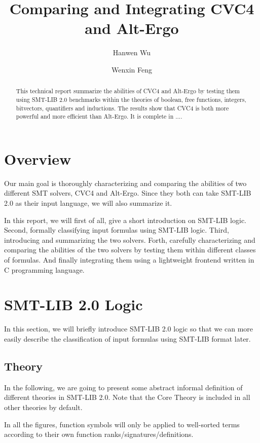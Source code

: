 \documentclass[11pt,letter]{article}
\title{Comparing and Integrating CVC4 and Alt-Ergo}
\author{Hanwen Wu}
\author{Wenxin Feng}
\affil{ Department of Computer Science\\Boston University\\ \small\texttt{hwwu,wenxinf@bu.edu}}
\theoremstyle{definition}
\begin{document}
\maketitle

\begin{abstract}
This technical report summarize the abilities of CVC4 and Alt-Ergo by testing them using SMT-LIB 2.0 benchmarks within the theories of boolean, free functions, integers, bitvectors, quantifiers and inductions. The results show that CVC4 is both more powerful and more efficient than Alt-Ergo. It is complete in ....
\end{abstract}
\section{Overview}

Our main goal is thoroughly characterizing and comparing the abilities of two different SMT solvers, CVC4\cite{barrett:cvc4:2011} and Alt-Ergo\cite{alt-ergo}. Since they both can take SMT-LIB 2.0\cite{bs2010} as their input language, we will also summarize it. 

In this report, we will first of all, give a short introduction on SMT-LIB logic. Second, formally classifying input formulas using SMT-LIB logic. Third, introducing and summarizing the two solvers. Forth, carefully characterizing and comparing the abilities of the two solvers by testing them within different classes of formulas. And finally integrating them using a lightweight frontend written in C programming language.

\section{SMT-LIB 2.0 Logic}

In this section, we will briefly introduce SMT-LIB 2.0 logic so that we can more easily describe the classification of input formulas using SMT-LIB format later.

\subsection{Theory}
In the following, we are going to present some abstract informal definition of different theories in SMT-LIB 2.0. Note that the Core Theory is included in all other theories by default.

In all the figures, function symbols will only be applied to well-sorted terms according to their own function ranks/signatures/definitions.
\end{document}
